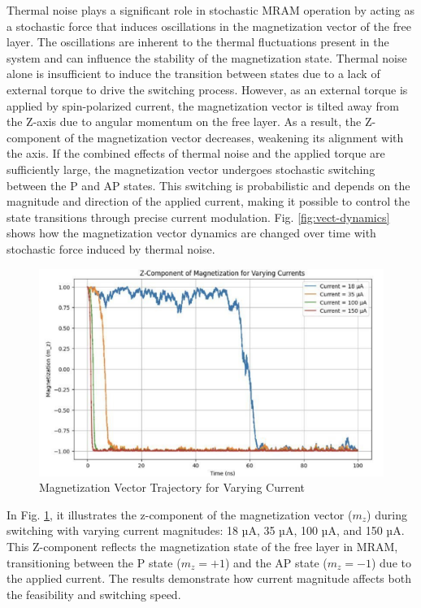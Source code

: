 \documentclass[conference]{IEEEtran}
\begin{document}
Thermal noise plays a significant role in stochastic MRAM operation by acting as a stochastic force that induces oscillations in the magnetization vector of the free layer. The oscillations are inherent to the thermal fluctuations present in the system and can influence the stability of the magnetization state. Thermal noise alone is insufficient to induce the transition between states due to a lack of external torque to drive the switching process. However, as an external torque is applied by spin-polarized current, the magnetization vector is tilted away from the Z-axis due to angular momentum on the free layer. As a result, the Z-component of the magnetization vector decreases, weakening its alignment with the axis. If the combined effects of thermal noise and the applied torque are sufficiently large, the magnetization vector undergoes stochastic switching between the P and AP states. This switching is probabilistic and depends on the magnitude and direction of the applied current, making it possible to control the state transitions through precise current modulation. Fig. \ref{fig:vect-dynamics} shows how the magnetization vector dynamics are changed over time with stochastic force induced by thermal noise. 


\begin{figure}
    \centering
    \includegraphics[width=1.1\linewidth]{Magnetization Vector Trajectory for Varying Current.png}
    \caption{Magnetization Vector Trajectory for Varying Current}
    \label{fig:vect-traj}
\end{figure}

In Fig. \ref{fig:vect-traj}, it illustrates the z-component of the magnetization vector (\(m_z\)) during switching with varying current magnitudes: 18 µA, 35 µA, 100 µA, and 150 µA. This Z-component reflects the magnetization state of the free layer in MRAM, transitioning between the P state (\(m_z = +1\)) and the AP state (\(m_z = -1\)) due to the applied current. The results demonstrate how current magnitude affects both the feasibility and switching speed. 
\end{document}
